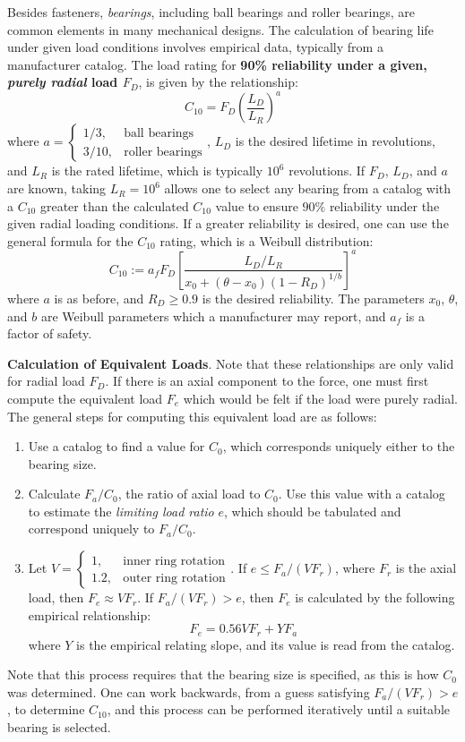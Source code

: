 Besides fasteners, \textit{bearings}, including ball bearings and roller bearings, are common elements in many mechanical designs. The calculation of bearing life under given load conditions involves empirical data, typically from a manufacturer catalog. The load rating for \textbf{90\% reliability under a given, \textit{purely radial} load $F_D$}, is given by the relationship: \[C_{10} = F_D \left(\frac{L_D}{L_R}\right)^a\tag{$90\%$ reliability}\] where $a=\begin{cases}
    1/3, & \text{ball bearings}\\
    3/10, & \text{roller bearings}
\end{cases}$, $L_D$ is the desired lifetime in revolutions, and $L_R$ is the rated lifetime, which is typically $10^6$ revolutions. If $F_D$, $L_D$, and $a$ are known, taking $L_R=10^6$ allows one to select any bearing from a catalog with a $C_{10}$ greater than the calculated $C_{10}$ value to ensure $90\%$ reliability under the given radial loading conditions. If a greater reliability is desired, one can use the general formula for the $C_{10}$ rating, which is a Weibull distribution: \[C_{10} := a_f F_D \left[\frac{L_D/L_R}{x_0+(\theta-x_0)(1-R_D)^{1/b}}\right]^a\] where $a$ is as before, and $R_D\geq 0.9$ is the desired reliability. The parameters $x_0$, $\theta$, and $b$ are Weibull parameters which a manufacturer may report, and $a_f$ is a factor of safety.

\begin{shaded}
\textbf{Calculation of Equivalent Loads}. Note that these relationships are only valid for radial load $F_D$. If there is an axial component to the force, one must first compute the equivalent load $F_e$ which would be felt if the load were purely radial. The general steps for computing this equivalent load are as follows: \begin{enumerate}
    \item[1.] Use a catalog to find a value for $C_0$, which corresponds uniquely either to the bearing size.
    \item[2.] Calculate $F_a/C_0$, the ratio of axial load to $C_0$. Use this value with a catalog to estimate the \textit{limiting load ratio} $e$, which should be tabulated and correspond uniquely to $F_a/C_0$.
    \item[3.] Let $V=\begin{cases}
        1,\ & \text{inner ring rotation}\\
        1.2, & \text{outer ring rotation}
    \end{cases}$. If $e\leq F_a/(VF_r)$, where $F_r$ is the axial load, then $F_e\approx VF_r$. If $F_a/(VF_r)> e$, then $F_e$ is calculated by the following empirical relationship: \[F_e = 0.56 V F_r + Y F_a\] where $Y$ is the empirical relating slope, and its value is read from the catalog.
\end{enumerate}
\end{shaded}

Note that this process requires that the bearing size is specified, as this is how $C_0$ was determined. One can work backwards, from a guess satisfying $F_a/(VF_r)>e$, to determine $C_{10}$, and this process can be performed iteratively until a suitable bearing is selected.